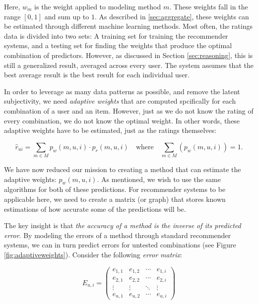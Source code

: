 Here, $w_m$ is the weight applied to modeling method $m$. These weights fall in the range $[0,1]$ and sum up to $1$.
As described in \ref{sec:aggregate}, these weights can be estimated through different machine learning methods.
Most often, the ratings data is divided into two sets:
A training set for training the recommender systems, and a testing set for finding the weights
that produce the optimal combination of predictors.
However, as discussed in Section \ref{sec:reasoning},
this is still a generalized result, averaged across every user. 
The system assumes that the best average result is the best result for each individual user.

In order to leverage as many data patterns as possible, and remove the latent subjectivity,
we need \emph{adaptive weights} that are computed spcifically for each combination of a user and an item.
However, just as we do not know the rating of every combination, we do not know the optimal weight.
In other words, these adaptive weights have to be estimated, just as the ratings themselves:

\begin{equation*}
  \hat{r}_{ui} = \sum_{m \in M} p_{w}(m,u,i) \cdot p_{r}(m,u,i)
  \quad \text{where} \quad
  \sum_{m \in M} (p_{w}(m,u,i)) = 1.
\end{equation*}

We have now reduced our mission to creating a method that can estimate the adaptive weights: $p_{w}(m,u,i)$.
As mentioned, we wish to use the same algorithms for both of these predictions.
For recommender systems to be applicable here, we need to create a matrix (or graph)
that stores known estimations of how accurate some of the predictions will be.



The key insight is that \emph{the accuracy of a method is the inverse of its predicted error}.
By modeling the errors of a method through standard recommender systems,
we can in turn predict errors for untested combinations
(see Figure \ref{fig:adaptiveweights}).
Consider the following \emph{error matrix}:

\begin{equation*}
 E_{u,i} =
 \begin{pmatrix}
    e_{1,1} & e_{1,2} & \cdots & e_{1,i} \\
    e_{2,1} & e_{2,2} & \cdots & e_{2,i} \\
    \vdots  & \vdots  & \ddots & \vdots  \\
    e_{u,1} & e_{u,2} & \cdots & e_{u,i}
 \end{pmatrix}
\end{equation*}

